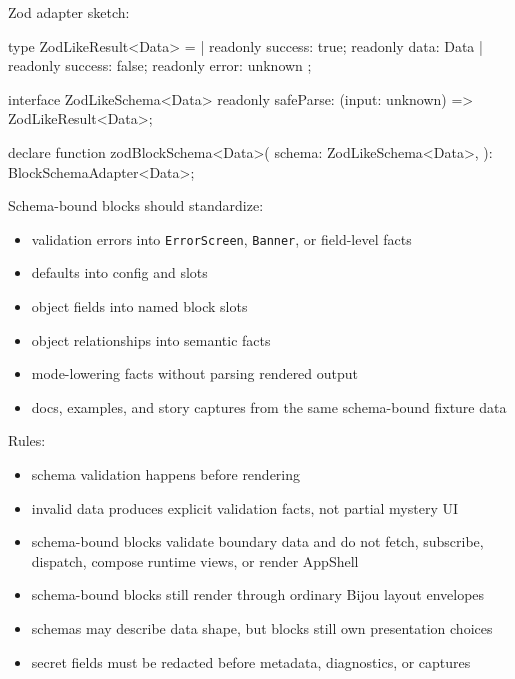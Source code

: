 Zod adapter sketch:

\begin{CodeBlock}
type ZodLikeResult<Data> =
  | { readonly success: true; readonly data: Data }
  | { readonly success: false; readonly error: unknown };

interface ZodLikeSchema<Data> {
  readonly safeParse: (input: unknown) => ZodLikeResult<Data>;
}

declare function zodBlockSchema<Data>(
  schema: ZodLikeSchema<Data>,
): BlockSchemaAdapter<Data>;
\end{CodeBlock}

Schema-bound blocks should standardize:

\begin{itemize}
\tightlist
\item
  validation errors into \texttt{E\allowbreak{}r\allowbreak{}r\allowbreak{}o\allowbreak{}r\allowbreak{}S\allowbreak{}c\allowbreak{}r\allowbreak{}e\allowbreak{}e\allowbreak{}n}, \texttt{B\allowbreak{}a\allowbreak{}n\allowbreak{}n\allowbreak{}e\allowbreak{}r}, or field-level facts
\item
  defaults into config and slots
\item
  object fields into named block slots
\item
  object relationships into semantic facts
\item
  mode-lowering facts without parsing rendered output
\item
  docs, examples, and story captures from the same schema-bound fixture data
\end{itemize}

Rules:

\begin{itemize}
\tightlist
\item
  schema validation happens before rendering
\item
  invalid data produces explicit validation facts, not partial mystery UI
\item
  schema-bound blocks validate boundary data and do not fetch, subscribe, dispatch, compose runtime views, or render AppShell
\item
  schema-bound blocks still render through ordinary Bijou layout envelopes
\item
  schemas may describe data shape, but blocks still own presentation choices
\item
  secret fields must be redacted before metadata, diagnostics, or captures
\end{itemize}

